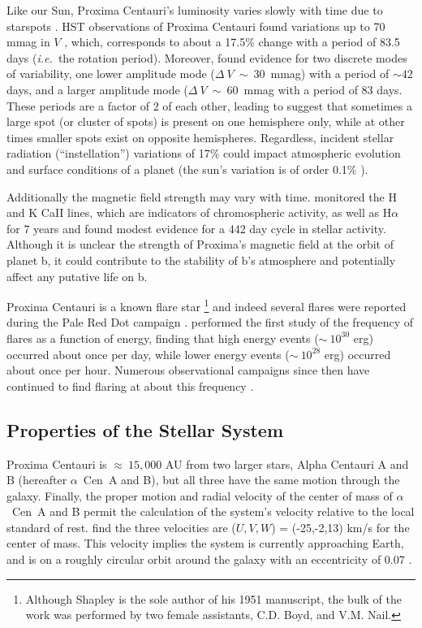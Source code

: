 \documentclass[preprint,12pt]{aastex}
\def\ie{{\it i.e.\ }}
\def\acen{{$\alpha$~Cen}}
\begin{document}
Like our Sun, Proxima Centauri's luminosity varies slowly with time
due to starspots \citep{Benedict93}. HST observations of Proxima
Centauri found variations up to 70 mmag in $V$ \citep{Benedict98},
which, corresponds to about a 17.5\% change with a period of 83.5 days
(\ie the rotation period). Moreover, \citep{Benedict98} found evidence
for two discrete modes of variability, one lower amplitude mode
($\Delta~V~\sim~30$~mmag) with a period of $\sim 42$ days, and a
larger amplitude mode ($\Delta~V~\sim~60$~mmag with a period of 83
days. These periods are a factor of 2 of each other, leading
\cite{Benedict98} to suggest that sometimes a large spot (or cluster
of spots) is present on one hemisphere only, while at other times
smaller spots exist on opposite hemispheres. Regardless, incident
stellar radiation (``instellation'') variations of 17\% could impact
atmospheric evolution and surface conditions of a planet (the sun's
variation is of order 0.1\% \citep{Willson81}).

Additionally the magnetic field strength may vary with
time. \cite{Cincunegui07} monitored the H and K CaII lines, which are
indicators of chromospheric activity, as well as H$\alpha$ for 7 years
and found modest evidence for a 442 day cycle in stellar
activity. Although it is unclear the strength of Proxima's magnetic
field at the orbit of planet b, it could contribute to the stability
of b's atmosphere and potentially affect any putative life on b.

Proxima Centauri is a known flare star
\citep{Shapley51}\footnote{Although Shapley is the sole author of his
  1951 manuscript, the bulk of the work was performed by two female
  assistants, C.D. Boyd, and V.M. Nail.}  and indeed several flares
were reported during the Pale Red Dot campaign
\cite{AngladaEscude16}. \cite{Walker81} performed the first study of
the frequency of flares as a function of energy, finding that high
energy events ($\sim~10^{30}$ erg) occurred about once per day, while
lower energy events ($\sim~10^{28}$ erg) occurred about once per
hour. Numerous observational campaigns since then have continued to
find flaring at about this frequency
\citep{Benedict98,AngladaEscude16}.

\subsection{Properties of the Stellar System}

Proxima Centauri is $\approx~15,000$ AU from two larger stars, Alpha
Centauri A and B (hereafter \acen~A and B), but all three have the
same motion through the galaxy. Finally, the proper motion and radial
velocity of the center of mass of \acen~A and B permit the calculation
of the system's velocity relative to the local standard of
rest. \cite{Poveda96} find the three velocities are ($U,V,W$) =
(-25,-2,13) km/s for the center of mass. This velocity implies the
system is currently approaching Earth, and is on a roughly circular
orbit around the galaxy with an eccentricity of 0.07
\cite{AllenHerrera98}.
\end{document}
